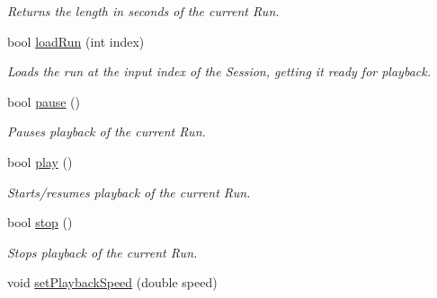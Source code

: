 \begin{DoxyCompactItemize}
\begin{DoxyCompactList}\small\item\em Returns the length in seconds of the current Run. \end{DoxyCompactList}\item 
bool \hyperlink{class_picto_1_1_playback_state_updater_a074e3dabbfb0409cd9d85f9073183200}{load\-Run} (int index)
\begin{DoxyCompactList}\small\item\em Loads the run at the input index of the Session, getting it ready for playback. \end{DoxyCompactList}\item 
\hypertarget{class_picto_1_1_playback_state_updater_a36002ee0e58ce84dd576446d18e791c8}{bool \hyperlink{class_picto_1_1_playback_state_updater_a36002ee0e58ce84dd576446d18e791c8}{pause} ()}\label{class_picto_1_1_playback_state_updater_a36002ee0e58ce84dd576446d18e791c8}

\begin{DoxyCompactList}\small\item\em Pauses playback of the current Run. \end{DoxyCompactList}\item 
\hypertarget{class_picto_1_1_playback_state_updater_a111f891bca68df378e047730ed7f6fec}{bool \hyperlink{class_picto_1_1_playback_state_updater_a111f891bca68df378e047730ed7f6fec}{play} ()}\label{class_picto_1_1_playback_state_updater_a111f891bca68df378e047730ed7f6fec}

\begin{DoxyCompactList}\small\item\em Starts/resumes playback of the current Run. \end{DoxyCompactList}\item 
\hypertarget{class_picto_1_1_playback_state_updater_af17a26bbf0e2971e38e77c6e93d2c048}{bool \hyperlink{class_picto_1_1_playback_state_updater_af17a26bbf0e2971e38e77c6e93d2c048}{stop} ()}\label{class_picto_1_1_playback_state_updater_af17a26bbf0e2971e38e77c6e93d2c048}

\begin{DoxyCompactList}\small\item\em Stops playback of the current Run. \end{DoxyCompactList}\item 
\hypertarget{class_picto_1_1_playback_state_updater_afdc719aaba777017387d558a64321dad}{void \hyperlink{class_picto_1_1_playback_state_updater_afdc719aaba777017387d558a64321dad}{set\-Playback\-Speed} (double speed)}\label{class_picto_1_1_playback_state_updater_afdc719aaba777017387d558a64321dad}


\end{DoxyCompactItemize}
